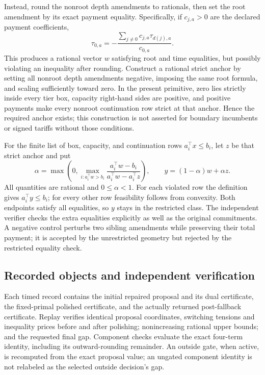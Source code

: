 Instead, round the nonroot depth amendments to rationals, then set the root amendment by its exact payment equality. Specifically, if $c_{j,a}>0$ are the declared payment coefficients,
\[
 \tau_{0,a}=-\frac{\sum_{j\ne0}c_{j,a}\tau_{d(j),a}}{c_{0,a}}.
\]
This produces a rational vector $w$ satisfying root and time equalities, but possibly violating an inequality after rounding. Construct a rational strict anchor by setting all nonroot depth amendments negative, imposing the same root formula, and scaling sufficiently toward zero. In the present primitive, zero lies strictly inside every tier box, capacity right-hand sides are positive, and positive payments make every nonroot continuation row strict at that anchor. Hence the required anchor exists; this construction is not asserted for boundary incumbents or signed tariffs without those conditions.

For the finite list of box, capacity, and continuation rows $a_i^\top x\leq b_i$, let $z$ be that strict anchor and put
\[
 \alpha=\max\left(0,\max_{i:a_i^\top w>b_i}
 \frac{a_i^\top w-b_i}{a_i^\top w-a_i^\top z}\right),\qquad
 y=(1-\alpha)w+\alpha z.
\]
All quantities are rational and $0\leq\alpha<1$. For each violated row the definition gives $a_i^\top y\leq b_i$; for every other row feasibility follows from convexity. Both endpoints satisfy all equalities, so $y$ stays in the restricted class. The independent verifier checks the extra equalities explicitly as well as the original commitments. A negative control perturbs two sibling amendments while preserving their total payment; it is accepted by the unrestricted geometry but rejected by the restricted equality check.

\subsection{Recorded objects and independent verification}
Each timed record contains the initial repaired proposal and its dual certificate, the fixed-primal polished certificate, and the actually returned post-fallback certificate. Replay verifies identical proposal coordinates, switching tensions and inequality prices before and after polishing; nonincreasing rational upper bounds; and the requested final gap. Component checks evaluate the exact four-term identity, including its outward-rounding remainder. An outside gate, when active, is recomputed from the exact proposal value; an ungated component identity is not relabeled as the selected outside decision's gap.


